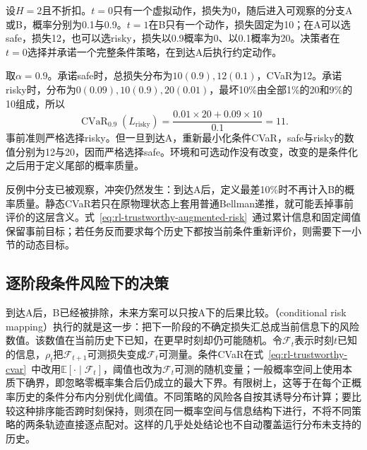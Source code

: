 \begin{example}[静态CVaR的时间不一致]
  \label{ex:rl-trustworthy-time-inconsistency}
  设$H=2$且不折扣。$t=0$只有一个虚拟动作，损失为0，随后进入可观察的分支A或B，概率分别为0.1与0.9。$t=1$在B只有一个动作，损失固定为10；在A可以选safe，损失12，也可以选risky，损失以0.9概率为0、以0.1概率为20。决策者在$t=0$选择并承诺一个完整条件策略，在到达A后执行约定动作。

  取$\alpha=0.9$。承诺safe时，总损失分布为$10(0.9),12(0.1)$，CVaR为12。承诺risky时，分布为$0(0.09),10(0.9),20(0.01)$，最坏10\%由全部1\%的20和9\%的10组成，所以
  \[
    \operatorname{CVaR}_{0.9}(L_{\text{risky}})
       =\frac{0.01\times20+0.09\times10}{0.1}=11.
  \]
  事前准则严格选择risky。但一旦到达A，重新最小化条件CVaR，safe与risky的数值分别为12与20，因而严格选择safe。环境和可选动作没有改变，改变的是条件化之后用于定义尾部的概率质量。
\end{example}

反例中分支已被观察，冲突仍然发生：到达A后，定义最差10\%时不再计入B的概率质量。静态CVaR若只在原物理状态上套用普通Bellman递推，就可能丢掉事前评价的这层含义。式~\eqref{eq:rl-trustworthy-augmented-risk}~通过累计信息和固定阈值保留事前目标；若任务反而要求每个历史下都按当前条件重新评价，则需要下一小节的动态目标。

\subsection{逐阶段条件风险下的决策}
\label{sec:rl-trustworthy-dynamic-risk}

到达A后，B已经被排除，未来方案可以只按A下的后果比较。（conditional risk mapping）执行的就是这一步：把下一阶段的不确定损失汇总成当前信息下的风险数值。该数值在当前历史下已知，在更早时刻却仍可能随机。令$\mathcal F_t$表示时刻$t$已知的信息，$\rho_t$把$\mathcal F_{t+1}$可测损失变成$\mathcal F_t$可测量。条件CVaR在式~\eqref{eq:rl-trustworthy-cvar}~中改用$\mathbb E[\cdot\mid\mathcal F_t]$，阈值也改为$\mathcal F_t$可测的随机变量；一般概率空间上使用本质下确界，即忽略零概率集合后仍成立的最大下界。有限树上，这等于在每个正概率历史的条件分布内分别优化阈值。不同策略的风险各自按其诱导分布计算；要比较这种排序能否跨时刻保持，则须在同一概率空间与信息结构下进行，不将不同策略的两条轨迹直接逐点配对。这样的几乎处处结论也不自动覆盖运行分布未支持的历史。

